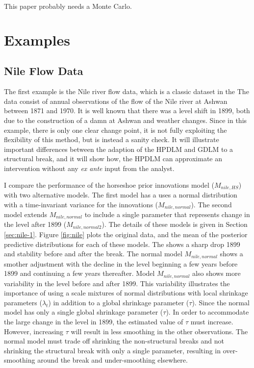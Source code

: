 \documentclass{article}
\begin{document}
This paper probably needs a Monte Carlo.

\section{Examples}
\label{sec:examples}

\subsection{Nile Flow Data}
\label{sec:nile}

The first example is the Nile river flow data, which is a classic dataset in the  \parencites{Cobb1978}{Balke1993}{JongPenzer1998}{DurbinKoopman2001}{DurbinKoopman2012}
The data consist of annual observations of the flow of the Nile river at Ashwan between 1871 and 1970.
It is well known that there was a level shift in 1899, both due to the construction of a damn at Ashwan and weather changes.
Since in this example, there is only one clear change point, it is not fully exploiting the flexibility of this method, but is instead a sanity check.
It will illustrate important differences between the adaption of the HPDLM and GDLM to a structural break,
and it will show how, the HPDLM can approximate an intervention without any \textit{ex ante} input from the analyst.

I compare the performance of the horseshoe prior innovations model ($M_{nile,HS}$) with two alternative models.
The first model has a uses a normal distribution with a time-invariant variance for the innovations ($M_{nile,normal}$).
The second model extends $M_{nile,normal}$ to include a single parameter that represents change in the level after 1899 ($M_{nile,normal2}$).
The details of these models is given in Section \ref{sec:nile-1}.
Figure \ref{fig:nile} plots the original data, and the mean of the posterior predictive distributions for each of these models.
The  shows a sharp drop 1899 and stability before and after the break.
The normal model $M_{nile,normal}$ shows a smother adjustment with the decline in the level beginning a few years before 1899 and continuing a few years thereafter.
Model $M_{nile,normal}$ also shows more variability in the level before and after 1899.
This variability illustrates the importance of using a scale mixtures of normal distributions with local shrinkage parameters ($\lambda_{t}$) in addition to a global shrinkage parameter ($\tau$).
Since the normal model has only a single global shrinkage parameter ($\tau$). 
In order to accommodate the large change in the level in 1899, the estimated value of $\tau$ must increase.
However, increasing $\tau$ will result in less smoothing in the other observations.
The normal model must trade off shrinking the non-structural breaks and not shrinking the structural break with only a single parameter, resulting in over-smoothing around the break and under-smoothing elsewhere.
\end{document}
